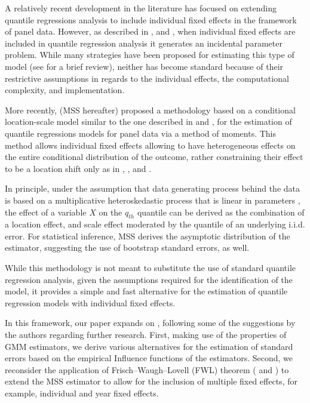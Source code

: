 \documentclass[
  authoryear,
  review,
  1p]{elsarticle}
\begin{document}
A relatively recent development in the literature has focused on
extending quantile regressions analysis to include individual fixed
effects in the framework of panel data. However, as described in
\citet{neymanscott1948}, and \citet{lancaster2000}, when individual
fixed effects are included in quantile regression analysis it generates
an incidental parameter problem. While many strategies have been
proposed for estimating this type of model (see
\citet{galvao2017quantile} for a brief review), neither has become
standard because of their restrictive assumptions in regards to the
individual effects, the computational complexity, and implementation.

More recently, \citet{mss2019} (MSS hereafter) proposed a methodology
based on a conditional location-scale model similar to the one described
in \citet{he1997} and \citet{zhao2000}, for the estimation of quantile
regressions models for panel data via a method of moments. This method
allows individual fixed effects allowing to have heterogeneous effects
on the entire conditional distribution of the outcome, rather
constraining their effect to be a location shift only as in
\citet{canay2011}, \citet{koenker2004}, and \citet{lamarche2010}.

In principle, under the assumption that data generating process behind
the data is based on a multiplicative heteroskedastic process that is
linear in parameters \citep[\citet{mss2019}, \citet{he1997},
\citet{zhao2000}]{cameron2005}, the effect of a variable \(X\) on the
\(q_{th}\) quantile can be derived as the combination of a location
effect, and scale effect moderated by the quantile of an underlying
i.i.d. error. For statistical inference, MSS derives the asymptotic
distribution of the estimator, suggesting the use of bootstrap standard
errors, as well.

While this methodology is not meant to substitute the use of standard
quantile regression analysis, given the assumptions required for the
identification of the model, it provides a simple and fast alternative
for the estimation of quantile regression models with individual fixed
effects.

In this framework, our paper expands on \citet{mss2019}, following some
of the suggestions by the authors regarding further research. First,
making use of the properties of GMM estimators, we derive various
alternatives for the estimation of standard errors based on the
empirical Influence functions of the estimators. Second, we reconsider
the application of Frisch--Waugh--Lovell (FWL) theorem
(\citet{frishwaugh1933} and \citet{lovell1963}) to extend the MSS
estimator to allow for the inclusion of multiple fixed effects, for
example, individual and year fixed effects.
\end{document}
